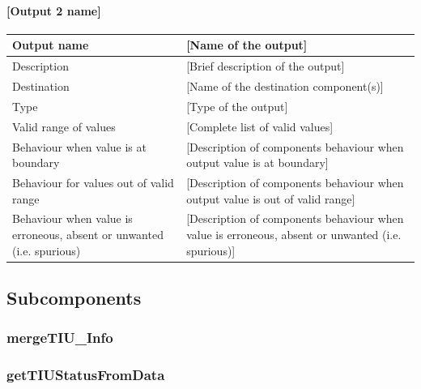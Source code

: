 \paragraph{[Output 2 name]}

\begin{longtable}{p{}p{}}
\toprule
Output name				& [Name of the output] \\
\midrule
Description				& [Brief description of the output] \\
\midrule
Destination				& [Name of the destination component(s)] \\ 
\midrule
Type					& [Type of the output] \\
\midrule
Valid range of values	& [Complete list of valid values] \\
\midrule
Behaviour when value is at boundary	& [Description of components behaviour when output value is at boundary] \\
\midrule
Behaviour for values out of valid range	& [Description of components behaviour when output value is out of valid range] \\
\midrule
Behaviour when value is erroneous, absent or unwanted (i.e. spurious) & [Description of components behaviour when value is erroneous, absent or unwanted (i.e. spurious)] \\
\bottomrule
\end{longtable}

\subsection{Subcomponents}\label{s:manageTIUInput_subcomponents}

\subsubsection{mergeTIU\_Info}


\subsubsection{getTIUStatusFromData}
